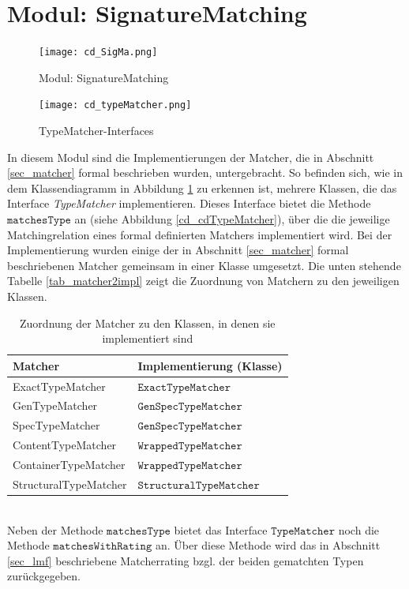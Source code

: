 \section{Modul: SignatureMatching}
\begin{figure}
\texttt{[image: cd\_SigMa.png]}
\caption{Modul: SignatureMatching}
\label{fig_cdSigMa}
\end{figure}
\begin{figure}
\texttt{[image: cd\_typeMatcher.png]}
\caption{TypeMatcher-Interfaces}
\label{fig_cdTypeMatcher}
\end{figure}
In diesem Modul sind die Implementierungen der Matcher, die in Abschnitt \ref{sec_matcher} formal beschrieben wurden, untergebracht. So befinden sich, wie in dem Klassendiagramm in Abbildung \ref{fig_cdSigMa} zu erkennen ist, mehrere Klassen, die das Interface \emph{TypeMatcher} implementieren. Dieses Interface bietet die Methode $\texttt{matchesType}$ an (siehe Abbildung \ref{cd_cdTypeMatcher}), über die die jeweilige Matchingrelation eines formal definierten Matchers implementiert wird. Bei der Implementierung wurden einige der in Abschnitt \ref{sec_matcher} formal beschriebenen Matcher gemeinsam in einer Klasse umgesetzt. Die unten stehende Tabelle \ref{tab_matcher2impl} zeigt die Zuordnung von Matchern zu den jeweiligen Klassen.
\begin{table}[h!]
\centering
\begin{tabular}{|l|l|}
\hline
\hline
\textbf{Matcher} & \textbf{Implementierung (Klasse)} \\
\hline
ExactTypeMatcher & $\texttt{ExactTypeMatcher}$ \\
\hline
GenTypeMatcher & $\texttt{GenSpecTypeMatcher}$ \\
\hline
SpecTypeMatcher & $\texttt{GenSpecTypeMatcher}$ \\
\hline
ContentTypeMatcher & $\texttt{WrappedTypeMatcher}$ \\
\hline
ContainerTypeMatcher & $\texttt{WrappedTypeMatcher}$ \\
\hline
StructuralTypeMatcher & $\texttt{StructuralTypeMatcher}$ \\
\hline
\hline
\end{tabular}
\caption{Zuordnung der Matcher zu den Klassen, in denen sie implementiert sind}
\end{table}\label{tab_matcher2impl}
\noindent
\\
Neben der Methode $\texttt{matchesType}$ bietet das Interface $\texttt{TypeMatcher}$ noch die Methode $\texttt{matchesWithRating}$ an. Über diese Methode wird das in Abschnitt \ref{sec_lmf} beschriebene Matcherrating bzgl. der beiden gematchten Typen zurückgegeben.
